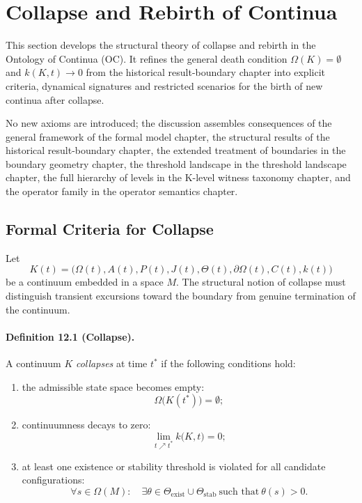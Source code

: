
\section{Collapse and Rebirth of Continua}
\label{sec:collapse-rebirth}

This section develops the structural theory of collapse and rebirth in the
Ontology of Continua (OC). It refines the general death condition
\(\Omega(K)=\emptyset\) and \(k(K,t)\to 0\) from
the historical result-boundary chapter into explicit criteria, dynamical signatures and
restricted scenarios for the birth of new continua after collapse.

No new axioms are introduced; the discussion assembles consequences of the
general framework of the formal model chapter, the structural results of
the historical result-boundary chapter, the extended treatment of boundaries in
the boundary geometry chapter, the threshold landscape in
the threshold landscape chapter, the full hierarchy of levels in
the K-level witness taxonomy chapter, and the operator family in
the operator semantics chapter.

\subsection{Formal Criteria for Collapse}

Let
\[
  K(t) =
  \big(
    \Omega(t), A(t), P(t), J(t),
    \Theta(t), \partial\Omega(t), C(t), k(t)
  \big)
\]
be a continuum embedded in a space \(M\). The structural notion of collapse
must distinguish transient excursions toward the boundary from genuine
termination of the continuum.

\paragraph{Definition 12.1 (Collapse).}
A continuum \(K\) \emph{collapses} at time \(t^{\ast}\) if the following
conditions hold:
\begin{enumerate}
  \item the admissible state space becomes empty:
        \[
          \Omega\big(K(t^{\ast})\big) = \emptyset;
        \]
  \item continuumness decays to zero:
        \[
          \lim_{t \nearrow t^{\ast}} k\big(K,t\big) = 0;
        \]
  \item at least one existence or stability threshold is violated for all
        candidate configurations:
        \[
          \forall s \in \Omega(M):
          \quad
          \exists \theta \in \Theta_{\mathrm{exist}} \cup \Theta_{\mathrm{stab}}
          \ \text{such that}\ \theta(s) > 0.
        \]
\end{enumerate}

